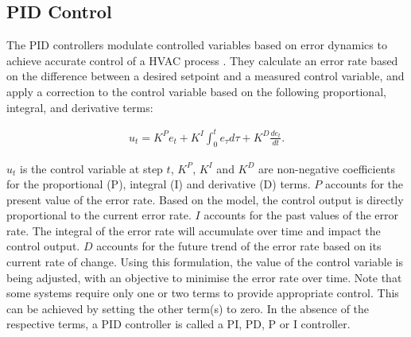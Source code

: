 
\subsection{PID Control}

The PID controllers modulate controlled variables based on error dynamics to achieve accurate control of a HVAC process \citep{xu2009model,gruber2015energy}. They calculate an error rate based on the difference between a desired setpoint and a measured control variable, and apply a correction to the control variable based on the following proportional, integral, and derivative terms:

\begingroup
\begin{align*}
u_t = K^P e_t + K^I \int_0^t{e_{\tau}} d\tau + K^D \frac{de_t}{dt}.
\end{align*}
\endgroup

\noindent $u_t$ is the control variable at step $t$, $K^P$, $K^I$ and $K^D$ are non-negative coefficients for the proportional (P), integral (I) and derivative (D) terms. $P$ accounts for the present value of the error rate. Based on the model, the control output is directly proportional to the current error rate. $I$ accounts for the past values of the error rate. The integral of the error rate will accumulate over time and impact the control output. $D$ accounts for the future trend of the error rate based on its current rate of change. Using this formulation, the value of the control variable is being adjusted, with an objective to minimise the error rate over time. Note that some systems require only one or two terms to provide appropriate control. This can be achieved by setting the other term(s) to zero. In the absence of the respective terms, a PID controller is called a PI, PD, P or I controller.

